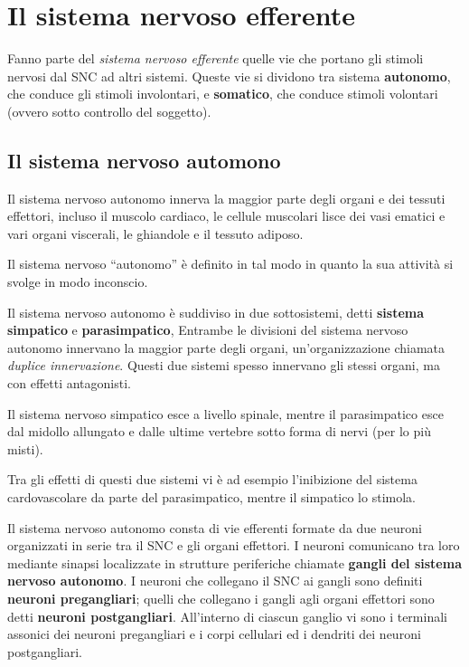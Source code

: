 \documentclass[]{article}
\date{}
\begin{document}
\section{Il sistema nervoso
efferente}\label{il-sistema-nervoso-efferente}

Fanno parte del \emph{sistema nervoso efferente} quelle vie che portano
gli stimoli nervosi dal SNC ad altri sistemi. Queste vie si dividono tra
sistema \textbf{autonomo}, che conduce gli stimoli involontari, e
\textbf{somatico}, che conduce stimoli volontari (ovvero sotto controllo
del soggetto).

\subsection{Il sistema nervoso
automono}\label{il-sistema-nervoso-automono}

Il sistema nervoso autonomo innerva la maggior parte degli organi e dei
tessuti effettori, incluso il muscolo cardiaco, le cellule muscolari
lisce dei vasi ematici e vari organi viscerali, le ghiandole e il
tessuto adiposo.

Il sistema nervoso ``autonomo'' è definito in tal modo in quanto la sua
attività si svolge in modo inconscio.

Il sistema nervoso autonomo è suddiviso in due sottosistemi, detti
\textbf{sistema simpatico} e \textbf{parasimpatico}, Entrambe le
divisioni del sistema nervoso autonomo innervano la maggior parte degli
organi, un'organizzazione chiamata \emph{duplice innervazione}. Questi
due sistemi spesso innervano gli stessi organi, ma con effetti
antagonisti.

Il sistema nervoso simpatico esce a livello spinale, mentre il
parasimpatico esce dal midollo allungato e dalle ultime vertebre sotto
forma di nervi (per lo più misti).

Tra gli effetti di questi due sistemi vi è ad esempio l'inibizione del
sistema cardovascolare da parte del parasimpatico, mentre il simpatico
lo stimola.

Il sistema nervoso autonomo consta di vie efferenti formate da due
neuroni organizzati in serie tra il SNC e gli organi effettori. I
neuroni comunicano tra loro mediante sinapsi localizzate in strutture
periferiche chiamate \textbf{gangli del sistema nervoso autonomo}. I
neuroni che collegano il SNC ai gangli sono definiti \textbf{neuroni
pregangliari}; quelli che collegano i gangli agli organi effettori sono
detti \textbf{neuroni postgangliari}. All'interno di ciascun ganglio vi
sono i terminali assonici dei neuroni pregangliari e i corpi cellulari
ed i dendriti dei neuroni postgangliari.
\end{document}
